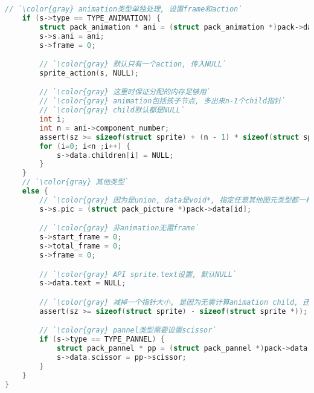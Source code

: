 {\begin{lstlisting}[language=C]
    // `\color{gray} animation类型单独处理, 设置frame和action`
    if (s->type == TYPE_ANIMATION) {
        struct pack_animation * ani = (struct pack_animation *)pack->data[id];
        s->s.ani = ani;
        s->frame = 0;

        // `\color{gray} 默认只有一个action, 传入NULL`
        sprite_action(s, NULL);

        // `\color{gray} 这里时保证分配的内存足够用`
        // `\color{gray} animation包括孩子节点, 多出来n-1个child指针`
        // `\color{gray} child默认都是NULL`
        int i;
        int n = ani->component_number;
        assert(sz >= sizeof(struct sprite) + (n - 1) * sizeof(struct sprite *));
        for (i=0; i<n ;i++) {
            s->data.children[i] = NULL;
        }
    }
    // `\color{gray} 其他类型`
    else {
        // `\color{gray} 因为是union, data是void*, 指定任意其他图元类型都一样`
        s->s.pic = (struct pack_picture *)pack->data[id];

        // `\color{gray} 非animation无需frame`
        s->start_frame = 0;
        s->total_frame = 0;
        s->frame = 0;

        // `\color{gray} API sprite.text设置, 默认NULL`
        s->data.text = NULL;

        // `\color{gray} 减掉一个指针大小, 是因为无需计算animation child, 还是代码没修改?`
        assert(sz >= sizeof(struct sprite) - sizeof(struct sprite *));

        // `\color{gray} pannel类型需要设置scissor`
        if (s->type == TYPE_PANNEL) {
            struct pack_pannel * pp = (struct pack_pannel *)pack->data[id];
            s->data.scissor = pp->scissor;
        }
    }
}

\end{lstlisting}
}



